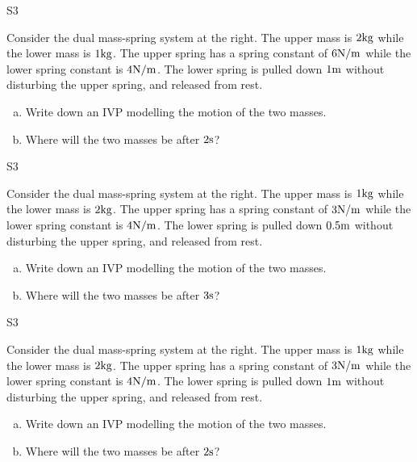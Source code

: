 \begin{problem}{S3}
\begin{minipage}[t]{0.8\linewidth}
Consider the dual mass-spring system at the right.  The upper mass is \(2 {\rm kg}\) while the lower mass is \(1 {\rm kg}\).  The upper spring has a spring constant of \( 6 {\rm N/m}\) while the lower spring constant is \(4 {\rm N/m}\).  The lower spring is pulled down \(1 {\rm m}\) without disturbing the upper spring, and released from rest. 
\begin{enumerate}[(a)]
\item Write down an IVP modelling the motion of the two masses.
\item Where will the two masses be after \(2 {\rm s}\)?
\end{enumerate}
\end{minipage}
\hfill
\springdoublemassQuiz[0.7]
\hfill
\end{problem}

\begin{problem}{S3}
\begin{minipage}[t]{0.8\linewidth}
Consider the dual mass-spring system at the right.  The upper mass is \(1 {\rm kg}\) while the lower mass is \(2 {\rm kg}\).  The upper spring has a spring constant of \( 3 {\rm N/m}\) while the lower spring constant is \(4 {\rm N/m}\).  The lower spring is pulled down \(0.5 {\rm m}\) without disturbing the upper spring, and released from rest. 
\begin{enumerate}[(a)]
\item Write down an IVP modelling the motion of the two masses.
\item Where will the two masses be after \(3 {\rm s}\)?
\end{enumerate}
\end{minipage}
\hfill
\springdoublemassQuiz[0.7]
\hfill
\end{problem}

\begin{problem}{S3}
\begin{minipage}[t]{0.8\linewidth}
Consider the dual mass-spring system at the right.  The upper mass is \(1 {\rm kg}\) while the lower mass is \(2 {\rm kg}\).  The upper spring has a spring constant of \( 3 {\rm N/m}\) while the lower spring constant is \(4 {\rm N/m}\).  The lower spring is pulled down \(1 {\rm m}\) without disturbing the upper spring, and released from rest. 
\begin{enumerate}[(a)]
\item Write down an IVP modelling the motion of the two masses.
\item Where will the two masses be after \(2 {\rm s}\)?
\end{enumerate}
\end{minipage}
\hfill
\springdoublemassQuiz[0.7]
\hfill
\end{problem}
